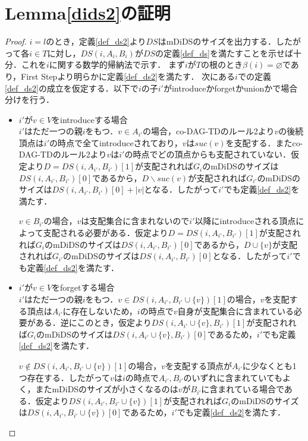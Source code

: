 \documentclass[master]{kuisthesis}		%
\theoremstyle{plain}
\theoremstyle{definition}
\begin{document}
\section{Lemma\ref{dids2}の証明}



\begin{proof}
    $i=l$のとき，定義\ref{def_ds2}より$DS$はmDiDSのサイズを出力する．したがって各$i \in T$に対し，$DS(i, A_i, B_i)$が$DS$の定義\ref{def_ds}を満たすことを示せば十分．これを$i$に関する数学的帰納法で示す．
    まず$i$が$T$の根のとき$\beta(i) = \varnothing$であり，First Stepより明らかに定義\ref{def_ds2}を満たす．
    次にある$i$での定義\ref{def_ds2}の成立を仮定する．以下で$i$の子$i'$がintroduceかforgetかunionかで場合分けを行う．
    \begin{itemize}
        \item $i'$が$v \in V$をintroduceする場合 \\
        $i'$はただ一つの親$i$をもつ．$v \in A_{i'}$の場合，co-DAG-TDのルール2より$v$の後続頂点は$i'$の時点で全てintroduceされており，$v$は$suc(v)$を支配する．またco-DAG-TDのルール2より$v$は$i'$の時点でどの頂点からも支配されていない．仮定より$D = DS(i, A_{i'}, B_{i'})[1]$が支配されれば$G_i$のmDiDSのサイズは$DS(i, A_{i'}, B_{i'})[0]$であるから，$D \backslash suc(v)$が支配されれば$G_{i'}$のmDiDSのサイズは$DS(i, A_{i'}, B_{i'})[0] + |v|$となる．したがって$i'$でも定義\ref{def_ds2}を満たす．

        $v \in B_{i'}$の場合，$v$は支配集合に含まれないので$i'$以降にintroduceされる頂点によって支配される必要がある．仮定より$D = DS(i, A_{i'}, B_{i'})[1]$が支配されれば$G_i$のmDiDSのサイズは$DS(i, A_{i'}, B_{i'})[0]$であるから，$D \cup \{v\}$が支配されれば$G_{i'}$のmDiDSのサイズは$DS(i, A_{i'}, B_{i'})[0]$となる．したがって$i'$でも定義\ref{def_ds2}を満たす．
        
        \item $i'$が$v \in V$をforgetする場合 \\
        $i'$はただ一つの親$i$をもつ．$v \in DS(i, A_{i'}, B_{i'} \cup \{v\})[1]$の場合，$v$を支配する頂点は$A_{i'}$に存在しないため，$i$の時点で$v$自身が支配集合に含まれている必要がある．逆にこのとき，仮定より$DS(i, A_{i'} \cup \{v\}, B_{i'})[1]$が支配されれば$G_i$のmDiDSのサイズは$DS(i, A_{i'} \cup \{v\}, B_{i'})[0]$であるため，$i'$でも定義\ref{def_ds2}を満たす．

        $v \notin DS(i, A_{i'}, B_{i'} \cup \{v\})[1]$の場合，$v$を支配する頂点が$A_{i'}$に少なくとも1つ存在する．したがって$v$は$i$の時点で$A_{i'}, B_{i'}$のいずれに含まれていてもよく，またmDiDSのサイズが小さくなるのは$v$が$B_{i'}$に含まれている場合である．仮定より$DS(i, A_{i'}, B_{i'} \cup \{v\})[1]$が支配されれば$G_i$のmDiDSのサイズは$DS(i, A_{i'}, B_{i'} \cup \{v\})[0]$であるため，$i'$でも定義\ref{def_ds2}を満たす．


\end{itemize}
\end{proof}
\end{document}
